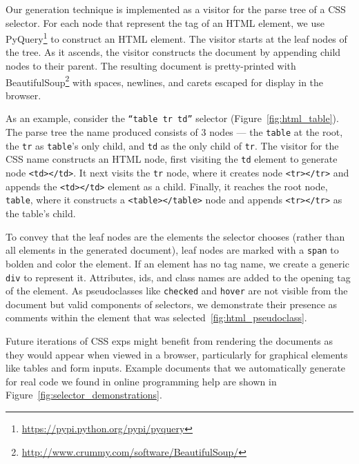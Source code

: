 Our generation technique is implemented as a visitor for the parse tree of a CSS selector.
For each node that represent the tag of an HTML element, we use PyQuery\footnote{\url{https://pypi.python.org/pypi/pyquery}} to construct an HTML element.
The visitor starts at the leaf nodes of the tree.
As it ascends, the visitor constructs the document by appending child nodes to their parent.
The resulting document is pretty-printed with BeautifulSoup\footnote{\url{http://www.crummy.com/software/BeautifulSoup/}} with spaces, newlines, and carets escaped for display in the browser.

As an example, consider the \texttt{``table tr td''} selector (Figure~\ref{fig:html_table}).
The parse tree the \Gls{name} produced consists of 3 nodes --- the \texttt{table} at the root, the \texttt{tr} as \texttt{table}'s only child, and \texttt{td} as the only child of \texttt{tr}.
The visitor for the CSS \Gls{name} constructs an HTML node, first visiting the \texttt{td} element to generate node \texttt{<td></td>}.
It next visits the \texttt{tr} node, where it creates node \texttt{<tr></tr>} and appends the \texttt{<td></td>} element as a child.
Finally, it reaches the root node, \texttt{table}, where it constructs a \texttt{<table></table>} node and appends \texttt{<tr></tr>} as the table's child.
\fi

To convey that the leaf nodes are the elements the selector chooses (rather than all elements in the generated document), leaf nodes are marked with a \texttt{span} to bolden and color the element.
If an element has no tag name, we create a generic \texttt{div} to represent it.
Attributes, ids, and class names are added to the opening tag of the element.
As pseudoclasses like \texttt{checked} and \texttt{hover} are not visible from the document but valid components of selectors, we demonstrate their presence as comments within the element that was selected~\ref{fig:html_pseudoclass}.

Future iterations of CSS \glspl{exp} might benefit from rendering the documents as they would appear when viewed in a browser, particularly for graphical elements like tables and form inputs.
Example documents that we automatically generate for real code we found in online programming help are shown in Figure~\ref{fig:selector_demonstrations}.
\fi
{}
\fi

